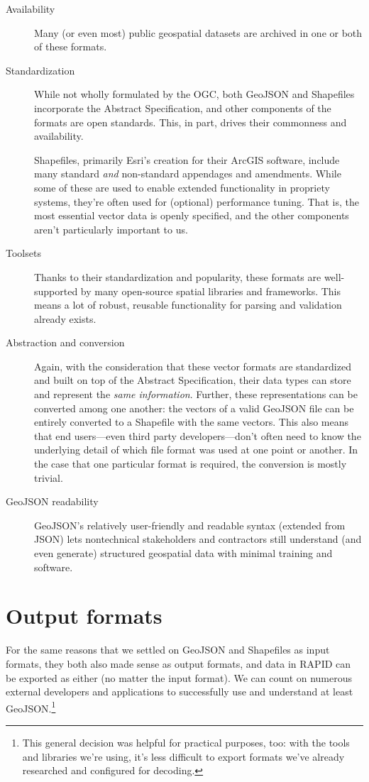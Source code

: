\begin{description}
  \item[Availability] Many (or even most) public geospatial datasets are archived in one or both of these formats.
  \item[Standardization] While not wholly formulated by the OGC, both GeoJSON and Shapefiles incorporate the Abstract Specification, and other components of the formats are open standards. This, in part, drives their commonness and availability.
  
Shapefiles, primarily Esri's creation for their ArcGIS software, include many standard \textit{and} non-standard appendages and amendments. While some of these are used to enable extended functionality in propriety systems, they're often used for (optional) performance tuning. That is, the most essential vector data is openly specified, and the other components aren't particularly important to us.

\item[Toolsets] Thanks to their standardization and popularity, these formats  are well-supported by many open-source spatial libraries and frameworks. This means a lot of robust, reusable functionality for parsing and validation already exists.

\item[Abstraction and conversion] Again, with the consideration that these vector formats are standardized and built on top of the Abstract Specification, their data types can store and represent the \textit{same information}. Further, these representations can be converted among one another: the vectors of a valid GeoJSON file can be entirely converted to a Shapefile with the same vectors. This also means that end users---even third party developers---don't often need to know the underlying detail of which file format was used at one point or another. In the case that one particular format is required, the conversion is mostly trivial.

\item[GeoJSON readability] GeoJSON's relatively user-friendly and readable syntax (extended from JSON) lets nontechnical stakeholders and contractors still understand (and even generate) structured geospatial data with minimal training and software.

\end{description}

\section{Output formats}
For the same reasons that we settled on GeoJSON and Shapefiles as input formats, they both also made sense as output formats, and data in RAPID can be exported as either (no matter the input format). We can count on numerous external developers and applications to successfully use and understand at least GeoJSON.\footnote{This general decision was helpful for practical purposes, too: with the tools and libraries we're using, it's less difficult to export formats we've already researched and configured for decoding.}

